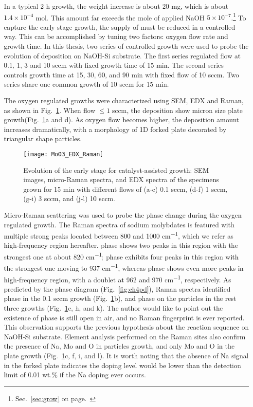 In a typical 2 h growth, the  weight increase is about 20 mg, which is about $1.4\times 10^{-4}$ mol. This amount far exceeds the mole of applied NaOH $5\times 10^{-7}$.\footnote{Sec.~\ref{sec:grow} on page.~\pageref{sec:grow}} To capture the early stage growth, the supply of  must be reduced in a controlled way. This can be accomplished by tuning two factors: oxygen flow rate and growth time. In this thesis, two series of controlled growth were used to probe the evolution of  deposition on NaOH-Si substrate. The first series regulated  flow at 0.1, 1, 3 and 10 sccm with fixed growth time of 15 min. The second series controls growth time at 15, 30, 60, and 90 min with fixed  flow of 10 sccm. Two series share one common growth of 10 sccm  for 15 min. 

The oxygen regulated growths were characterized using SEM, EDX and Raman, as shown in Fig.~\ref{fig:ch4oxy}. When  flow $\leq 1$ sccm, the deposition show micron size plate growth(Fig.~\ref{fig:ch4oxy}a and d). As oxygen flow becomes higher, the deposition amount increases dramatically, with a morphology of 1D forked plate decorated by triangular shape particles.
\begin{figure}[htb]
\centering
\texttt{[image: MoO3\_EDX\_Raman]}
\caption[Growth evolution of : first stage]{Evolution of the early stage for catalyst-assisted  growth: SEM images, micro-Raman spectra, and EDX spectra of the specimens grown for 15 min with different  flows of (a-c) 0.1 sccm, (d-f) 1 sccm, (g-i) 3 sccm, and (j-l) 10 sccm. }
\label{fig:ch4oxy}
\end{figure}

Micro-Raman scattering was used to probe the phase change during the oxygen regulated growth. The Raman spectra of sodium molybdates is featured with multiple strong peaks located between 800 and 1000 \si{cm^{-1}}, which we refer as high-frequency region hereafter.  phase shows two peaks in this region with the strongest one at about 820 \si{cm^{-1}};  phase exhibits four peaks in this region with the strongest one moving to 937 \si{cm^{-1}}, whereas  phase shows even more peaks in high-frequency region, with a doublet at 962 and 970 \si{cm^{-1}}, respectively.\cite{Schofield2005,Saraiva2011} As predicted by the phase diagram (Fig.~\ref{fig:ch4pd}), Raman spectra identified  phase in the 0.1 sccm growth (Fig.~\ref{fig:ch4oxy}b), and  phase on the particles in the rest three growths (Fig.~\ref{fig:ch4oxy}e, h, and k). The author would like to point out the existence of  phase is still open in air, and no Raman fingerprint is ever reported.\cite{Fomichev1992} This observation supports the previous hypothesis about the reaction sequence on NaOH-Si substrate. Element analysis performed on the Raman sites also confirm the presence of Na, Mo and O in particles growth, and only Mo and O in the plate growth (Fig.~\ref{fig:ch4oxy}c, f, i, and l). It is worth noting that the absence of Na signal in the forked  plate indicates the doping level would be lower than the detection limit of 0.01 wt.\% if the Na doping ever occurs. 

